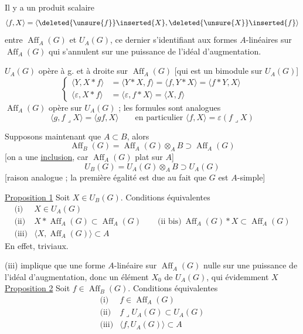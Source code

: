 Il y a un produit scalaire
\[
\langle f,X\rangle=\langle\deleted{\unsure{f}}\inserted{X},\deleted{\unsure{X}}\inserted{f}\rangle
\]
entre $\operatorname{Aff}_A(G)$ et $U_A(G)$, ce dernier s'identifiant aux formes $A$-linéaires sur $\operatorname{Aff}_A(G)$ qui s'annulent sur une puissance de l'idéal d'augmentation.

$U_A(G)$ opère à g. et à droite sur $\operatorname{Aff}_A(G)$ [qui est un bimodule sur $U_A(G)$]
\[
\left\{\begin{aligned}
\langle Y,X*f\rangle&=\langle Y*X,f\rangle=\langle f,Y*X\rangle=\langle f*Y,X\rangle\\
\langle\varepsilon,X*f\rangle&=\langle\varepsilon,f*X\rangle=\langle X,f\rangle
\end{aligned}\right.
\]
$\operatorname{Aff}_A(G)$ opère  sur $U_A(G)$ ; les formules sont  analogues
\[
\langle g,f\mathbin{\lrcorner}X\rangle=\langle gf,X\rangle
\qquad\text{en particulier }\langle f,X\rangle=\varepsilon(f\mathbin{\lrcorner}X)
\]

Supposons maintenant que $A\subset B$, alors
\[
\operatorname{Aff}_B(G)=\operatorname{Aff}_A(G)\otimes_A B\supset\operatorname{Aff}_A(G)
\]
[on a une \uline{inclusion}, car $\operatorname{Aff}_A(G)$ plat sur $A$]
\[
U_B(G)=U_A(G)\otimes_A B\supset U_A(G)
\]
[raison analogue ; la première égalité est due au fait que $G$ est $A$-simple]

\uline{Proposition 1} Soit $X\in U_B(G)$. Conditions équivalentes
\[
\begin{array}{ll}
\text{(i)}&X\in U_A(G)\\
\text{(ii)}&X*\operatorname{Aff}_A(G)\subset\operatorname{Aff}_A(G)
\qquad\text{(ii bis)}\ \operatorname{Aff}_A(G)*X\subset\operatorname{Aff}_A(G)\\
\text{(iii)}&\langle X,\operatorname{Aff}_A(G)\rangle\subset A
\end{array}
\]
En effet,
triviaux.

(iii) implique que    une forme $A$-linéaire sur $\operatorname{Aff}_A(G)$ nulle sur une puissance de l'idéal d'augmentation, donc un élément $X_0$ de $U_A(G)$, qui  évidemment  $X$
\uline{Proposition 2} Soit $f\in\operatorname{Aff}_B(G)$.  Conditions équivalentes
\[
\begin{array}{ll}
\text{(i)}&f\in\operatorname{Aff}_A(G)\\
\text{(ii)}&f\mathbin{\lrcorner}U_A(G)\subset U_A(G)\\
\text{(iii)}&\langle f,U_A(G)\rangle\subset A
\end{array}
\]
\margin{\unsure{)}}

